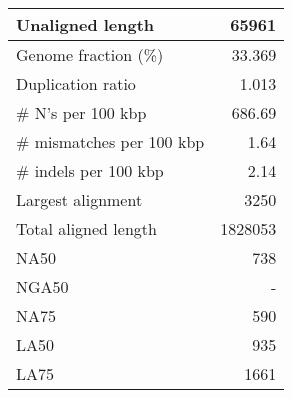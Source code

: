 \documentclass[12pt,a4paper]{article}
\begin{document}
\begin{table}[ht]
\begin{center}
\begin{tabular}{|l*{1}{|r}|}
Unaligned length & 65961 \\ \hline
Genome fraction (\%) & 33.369 \\ \hline
Duplication ratio & 1.013 \\ \hline
\# N's per 100 kbp & 686.69 \\ \hline
\# mismatches per 100 kbp & 1.64 \\ \hline
\# indels per 100 kbp & 2.14 \\ \hline
Largest alignment & 3250 \\ \hline
Total aligned length & 1828053 \\ \hline
NA50 & 738 \\ \hline
NGA50 & - \\ \hline
NA75 & 590 \\ \hline
LA50 & 935 \\ \hline
LA75 & 1661 \\ \hline
\end{tabular}
\end{center}
\end{table}
\end{document}
